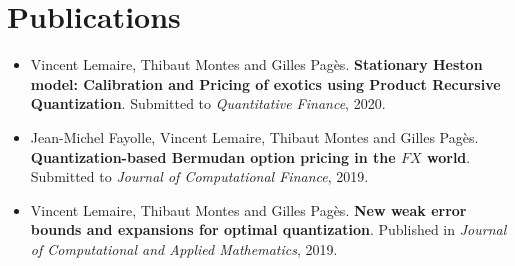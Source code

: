 \documentclass[]{deedy-resume-openfont}
\begin{document}
\begin{minipage}[t]{0.59\textwidth}

	\vspace{\topsep}

	\section{Publications}
	\vspace{-0.1cm}
	\begin{itemize}
		\item[\diamond] Vincent Lemaire, Thibaut Montes and Gilles Pagès. \textbf{Stationary Heston model: Calibration and Pricing of exotics using Product Recursive Quantization}. Submitted to \textit{Quantitative Finance}, 2020.
		\item[\diamond] Jean-Michel Fayolle, Vincent Lemaire, Thibaut Montes and Gilles Pagès. \textbf{Quantization-based Bermudan option pricing in the $FX$ world}. Submitted to \textit{Journal of Computational Finance}, 2019.
		\item[\diamond] Vincent Lemaire, Thibaut Montes and Gilles Pagès. \textbf{New weak error bounds and expansions for optimal quantization}. Published in \textit{Journal of Computational and Applied Mathematics}, 2019.
	\end{itemize}


	\vspace{-1.cm}
	\renewcommand\refname{\vskip -1.5em} %
	
	
	\nocite{*}

\end{minipage}
\end{document}
